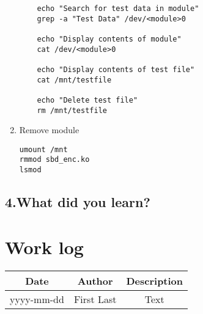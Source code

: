 \documentclass[letterpaper,10pt,fleqn]{article}
\begin{document}
\begin{enumerate}
\begin{lstlisting}
	echo "Search for test data in module"
	grep -a "Test Data" /dev/<module>0

	echo "Display contents of module"
	cat /dev/<module>0

	echo "Display contents of test file"
	cat /mnt/testfile

	echo "Delete test file"
	rm /mnt/testfile
\end{lstlisting}

\item Remove module
\begin{lstlisting}
umount /mnt
rmmod sbd_enc.ko
lsmod
\end{lstlisting}

	\end{enumerate}

	\subsection*{4.What did you learn?}


	\section*{Work log}
	\begin{center}
				\begin{tabular}{ |c|c|c| }
					\hline
					Date & Author & Description \\
					\hline
					yyyy-mm-dd & First Last & Text \\
					\hline
				\end{tabular}
			\end{center}
\end{document}
